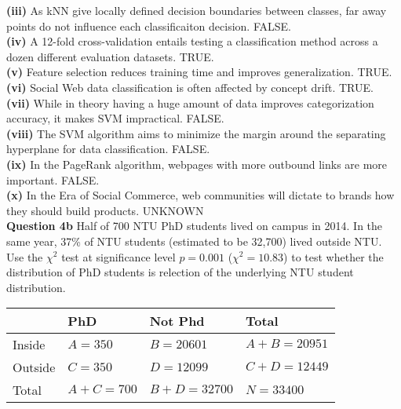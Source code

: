 \documentclass[11pt,a4paper]{report}
\begin{document}
\begin{multicols*}{2}
\noindent \textbf{(iii)} As kNN give locally defined decision boundaries between classes, far away points do not influence each classificaiton decision. FALSE.\\

\noindent \textbf{(iv)} A 12-fold cross-validation entails testing a classification method across a dozen different evaluation datasets. TRUE.\\

\noindent \textbf{(v)} Feature selection reduces training time and improves generalization. TRUE.\\

\noindent \textbf{(vi)} Social Web data classification is often affected by concept drift. TRUE.\\

\noindent \textbf{(vii)} While in theory having a huge amount of data improves categorization accuracy, it makes SVM impractical. FALSE.\\

\noindent \textbf{(viii)} The SVM algorithm aims to minimize the margin around the separating hyperplane for data classification. FALSE.\\

\noindent \textbf{(ix)} In the PageRank algorithm, webpages with more outbound links are more important. FALSE.\\

\noindent \textbf{(x)} In the Era of Social Commerce, web communities will dictate to brands how they should build products. UNKNOWN\\

\noindent \textbf{Question 4b} Half of 700 NTU PhD students lived on campus in 2014. In the same year, 37\% of NTU students (estimated to be 32,700) lived outside NTU. Use the $\chi^2$ test at significance level $p=0.001$ ($\chi^2=10.83$) to test whether the distribution of PhD students is relection of the underlying NTU student distribution.

\scriptsize
\begin{center}
\begin{tabular}{ |l|l|l|l| } 
    \hline
            & PhD       & Not Phd     & Total \\
    \hline 
    Inside  & $A = 350$ & $B = 20601$ & $A+B=20951$ \\
    Outside & $C = 350$ & $D = 12099$ & $C+D=12449$ \\
    Total   & $A+C=700$ & $B+D=32700$ & $N=33400$ \\
    \hline
\end{tabular}
\end{center}
\normalsize


\end{multicols*}
\end{document}
